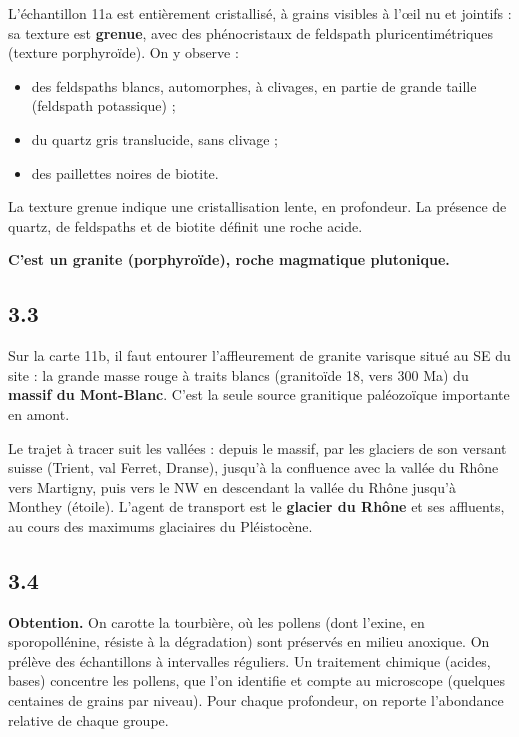 \documentclass[11pt,a4paper]{article}
\providecommand{\tightlist}{\setlength{\itemsep}{0pt}\setlength{\parskip}{0pt}}
\begin{document}
L'échantillon 11a est entièrement cristallisé, à grains visibles à l'œil nu et jointifs : sa texture est \textbf{grenue}, avec des phénocristaux de feldspath pluricentimétriques (texture porphyroïde). On y observe :

\begin{itemize}
\tightlist
\item
  des feldspaths blancs, automorphes, à clivages, en partie de grande taille (feldspath potassique) ;
\item
  du quartz gris translucide, sans clivage ;
\item
  des paillettes noires de biotite.
\end{itemize}

La texture grenue indique une cristallisation lente, en profondeur. La présence de quartz, de feldspaths et de biotite définit une roche acide.

\textbf{C'est un granite (porphyroïde), roche magmatique plutonique.}

\hypertarget{section-30}{%
\subsection{3.3}\label{section-30}}

Sur la carte 11b, il faut entourer l'affleurement de granite varisque situé au SE du site : la grande masse rouge à traits blancs (granitoïde 18, vers 300 Ma) du \textbf{massif du Mont-Blanc}. C'est la seule source granitique paléozoïque importante en amont.

Le trajet à tracer suit les vallées : depuis le massif, par les glaciers de son versant suisse (Trient, val Ferret, Dranse), jusqu'à la confluence avec la vallée du Rhône vers Martigny, puis vers le NW en descendant la vallée du Rhône jusqu'à Monthey (étoile). L'agent de transport est le \textbf{glacier du Rhône} et ses affluents, au cours des maximums glaciaires du Pléistocène.

\hypertarget{section-31}{%
\subsection{3.4}\label{section-31}}

\textbf{Obtention.} On carotte la tourbière, où les pollens (dont l'exine, en sporopollénine, résiste à la dégradation) sont préservés en milieu anoxique. On prélève des échantillons à intervalles réguliers. Un traitement chimique (acides, bases) concentre les pollens, que l'on identifie et compte au microscope (quelques centaines de grains par niveau). Pour chaque profondeur, on reporte l'abondance relative de chaque groupe.
\end{document}

